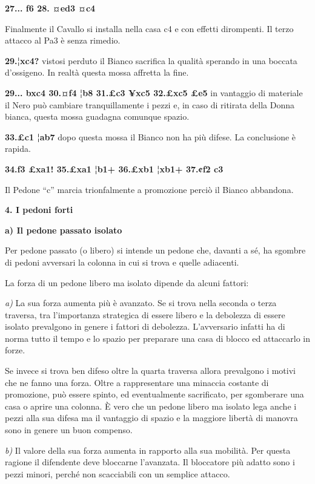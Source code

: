 \textbf{27... f6 28. ¤ed3 ¤c4}


Finalmente il Cavallo si installa nella casa c4 e con effetti
dirompenti. Il terzo attacco al Pa3 è senza rimedio.

\textbf{29.¦xc4?} vistosi perduto il Bianco sacrifica la qualità
sperando in una boccata d'ossigeno. In realtà questa mossa affretta la
fine.

\textbf{29... bxc4 30.¤f4 ¦b8 31.£c3 ¥xc5 32.£xc5 £e5} in vantaggio di
materiale il Nero può cambiare tranquillamente i pezzi e, in caso di
ritirata della Donna bianca, questa mossa guadagna comunque spazio.

\textbf{33.£c1 ¦ab7} dopo questa mossa il Bianco non ha più difese. La
conclusione è rapida.

\textbf{34.f3 £xa1! 35.£xa1 ¦b1+ 36.£xb1 ¦xb1+ 37.¢f2 c3}


Il Pedone ``c'' marcia trionfalmente a promozione perciò il Bianco
abbandona.

\textbf{4. I pedoni forti}

\textbf{a) Il pedone passato isolato}

Per pedone passato (o libero) si intende un pedone che, davanti a sé, ha
sgombre di pedoni avversari la colonna in cui si trova e quelle
adiacenti.

La forza di un pedone libero ma isolato dipende da alcuni fattori:

\emph{a)} La sua forza aumenta più è avanzato. Se si trova nella seconda
o terza traversa, tra l'importanza strategica di essere libero e la
debolezza di essere isolato prevalgono in genere i fattori di debolezza.
L'avversario infatti ha di norma tutto il tempo e lo spazio per
preparare una casa di blocco ed attaccarlo in forze.

Se invece si trova ben difeso oltre la quarta traversa allora prevalgono
i motivi che ne fanno una forza. Oltre a rappresentare una minaccia
costante di promozione, può essere spinto, ed eventualmente sacrificato,
per sgomberare una casa o aprire una colonna. È vero che un pedone
libero ma isolato lega anche i pezzi alla sua difesa ma il vantaggio di
spazio e la maggiore libertà di manovra sono in genere un buon compenso.

\emph{b)} Il valore della sua forza aumenta in rapporto alla sua
mobilità. Per questa ragione il difendente deve bloccarne l'avanzata. Il
bloccatore più adatto sono i pezzi minori, perché non scacciabili con un
semplice attacco.

